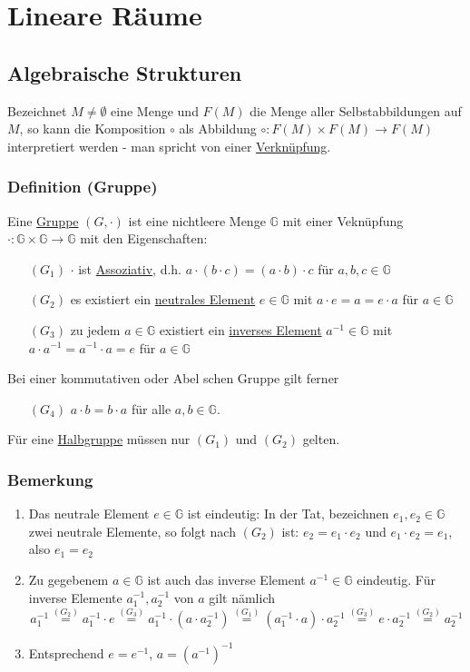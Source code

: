 \section{Lineare Räume}
\subsection{Algebraische Strukturen}
Bezeichnet $M\not=\emptyset$ eine Menge und $F(M)$ die Menge aller Selbstabbildungen auf $M$, so kann die Komposition $\circ$ als Abbildung $\circ : F(M)\times F(M) \rightarrow F(M)$ interpretiert werden - man spricht von einer \underline{Verknüpfung}.
\subsubsection{Definition (Gruppe)}
Eine \underline{Gruppe} $(G,\cdot)$ ist eine nichtleere Menge $\mathbb{G}$ mit einer Veknüpfung $\cdot:\mathbb{G}\times\mathbb{G} \rightarrow \mathbb{G}$ mit den Eigenschaften:
\begin{enumerate}
\item[$(G_1)$] $\cdot$ ist \underline{Assoziativ}, d.h. $a\cdot(b\cdot c)=(a\cdot b)\cdot c$ für $a,b,c\in \mathbb{G}$\\
\item[$(G_2)$] es existiert ein \underline{neutrales Element} $e\in\mathbb{G}$ mit $a\cdot e=a=e\cdot a$ für $a\in\mathbb{G}$\\
\item[$(G_3)$] zu jedem $a\in\mathbb{G}$ existiert ein \underline{inverses Element} $a^{-1}\in \mathbb{G}$ mit $a\cdot a^{-1}=a^{-1}\cdot a=e$ für $a\in \mathbb{G}$ \end{enumerate}
Bei einer kommutativen oder Abel schen Gruppe gilt ferner
\begin{enumerate}\item[$(G_4)$] $a\cdot b=b\cdot a$ für alle $a,b\in \mathbb{G}$.\end{enumerate}
Für eine \underline{Halbgruppe} müssen nur $(G_1)$ und $(G_2)$ gelten.
\subsubsection{Bemerkung}
\label{2.1.2}
\renewcommand{\labelenumi}{(\arabic{enumi})}
\begin{enumerate}
\item Das neutrale Element $e\in\mathbb{G}$ ist eindeutig: In der Tat, bezeichnen $e_1,e_2\in\mathbb{G}$ zwei neutrale Elemente, so folgt nach $(G_2)$ ist: $e_2=e_1\cdot e_2$ und $e_1\cdot e_2=e_1$, also $e_1=e_2$
\item Zu gegebenem $a\in\mathbb{G}$ ist auch das inverse Element $a^{-1}\in\mathbb{G}$ eindeutig.  Für inverse Elemente $a_1^{-1},a_2^{-1}$ von $a$ gilt nämlich
\[a_1^{-1}\stackrel{(G_2)}{=}a_1^{-1}\cdot e\stackrel{(G_3)}{=}a_1^{-1}\cdot(a\cdot a_2^{-1})\stackrel{(G_1)}{=}(a_1^{-1}\cdot a)\cdot a_2^{-1}\stackrel{(G_3)}{=}e\cdot a_2^{-1}\stackrel{(G_2)}{=}a_2^{-1}\]
\item Entsprechend $e=e^{-1}$, $a=(a^{-1})^{-1}$
\end{enumerate}
